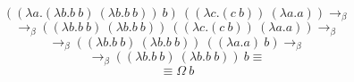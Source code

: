 \documentclass[12pt]{article}
\begin{document}
\[ ((\lambda a.(\lambda b.b \ b) \ (\lambda b.b \ b)) \ b) \ ((\lambda c.(c \ b)) \ (\lambda a.a)) \rightarrow_\beta \]
\[ \rightarrow_\beta ((\lambda b.b \ b) \ (\lambda b.b \ b)) \ ((\lambda c.(c \ b)) \ (\lambda a.a)) \rightarrow_\beta \]
\[ \rightarrow_\beta ((\lambda b.b \ b) \ (\lambda b.b \ b)) \ ((\lambda a.a) \ b) \rightarrow_\beta \]
\[ \rightarrow_\beta ((\lambda b.b \ b) \ (\lambda b.b \ b)) \ b \equiv \]
\[ \equiv \Omega \ b \]
\end{document}
